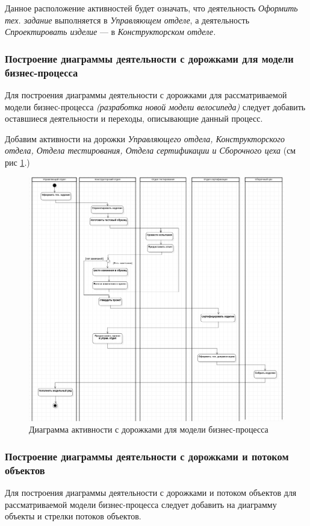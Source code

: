 \documentclass[a4paper,12pt]{extreport}
\begin{document}
Данное расположение активностей будет означать, что деятельность \textit{Оформить тех. задание} выполняется в \textit{Управляющем отделе}, а деятельность \textit{Спроектировать изделие} --- в \textit{Конструкторском отделе.}
\subsubsection*{Построение диаграммы деятельности с дорожками для модели бизнес-процесса}
Для построения диаграммы деятельности с дорожками для рассматриваемой модели бизнес-процесса \textit{(разработка новой модели велосипеда)} следует добавить оставшиеся деятельности и переходы, описывающие данный процесс. 

Добавим активности на дорожки \textit{Управляющего отдела, Конструкторского отдела, Отдела тестирования, Отдела сертификации и Сборочного цеха} (см рис \ref{fig:activitydiagramswimlane}.)
\begin{figure}[h!]
	\centering
	\includegraphics[width=0.8\linewidth]{images/activitydiagramswimlane}
	\caption{Диаграмма активности с дорожками для модели бизнес-процесса}
	\label{fig:activitydiagramswimlane}
\end{figure}

\subsubsection*{Построение диаграммы деятельности с дорожками и потоком объектов}

Для построения диаграммы деятельности с дорожками и потоком объектов для рассматриваемой модели бизнес-процесса следует добавить на диаграмму объекты и стрелки потоков объектов. 
\end{document}
